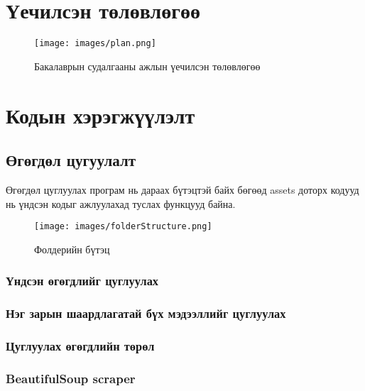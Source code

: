 
\appendix
{}

\chapter{Үечилсэн төлөвлөгөө}
\begin{figure}[ht]
	\centering
	\texttt{[image: images/plan.png]}
	\caption{Бакалаврын судалгааны ажлын үечилсэн төлөвлөгөө}
	\label{fig:plan01}
\end{figure}
\chapter{Кодын хэрэгжүүлэлт}

\section{Өгөгдөл цугуулалт}
Өгөгдөл цуглуулах програм нь дараах бүтэцтэй байх бөгөөд assets доторх кодууд нь үндсэн кодыг ажлуулахад туслах функцууд байна.
\begin{figure}[ht]
	\centering
	\texttt{[image: images/folderStructure.png]}
	\caption{Фолдерийн бүтэц}\label{fig:folderStructure}
\end{figure}
\subsection{Үндсэн өгөгдлийг цуглуулах}

\subsection{Нэг зарын шаардлагатай бүх мэдээллийг цуглуулах}

\subsection{Цуглуулах өгөгдлийн төрөл}

\subsection{BeautifulSoup scraper}

